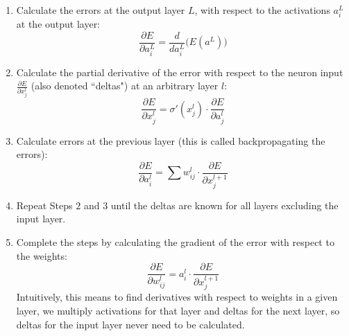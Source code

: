 \begin{enumerate}
    \item Calculate the errors at the output layer $L$, with respect to the activations $a_i^L$ at the output layer: 
    $$
    \frac{\partial E}{\partial a_i^L} = \frac{d}{d a_i^L} \Big( E(a^L) \Big)
    $$
    
    \item Calculate the partial derivative of the error with respect to the neuron input $\frac{\partial E}{\partial x_j^l}$ (also denoted ``deltas") at an arbitrary layer $l$:
    $$
    \frac{\partial E}{\partial x_j^l} = \sigma ' (x_j^l) \cdot  \frac{\partial E}{\partial a_j^l}
    $$
    
    \item Calculate errors at the previous layer (this is called backpropagating the errors):
    $$
    \frac{\partial E}{\partial a_i^l} = \sum w_{ij}^l \cdot \frac{\partial E}{\partial x_j^{l+1} }
    $$
    
    \item Repeat Steps $2$ and $3$ until the deltas are known for all layers excluding the input layer. 
    
    \item Complete the steps by calculating the gradient of the error with respect to the weights: 
    $$
    \frac{\partial E}{\partial w_{ij}^l} = a_i^l \cdot \frac{\partial E}{\partial x_j^{l+1}}
    $$
    Intuitively, this means to find derivatives with respect to weights in a given layer, we multiply activations for that layer and deltas for the next layer, so deltas for the input layer never need to be calculated. 
\end{enumerate}